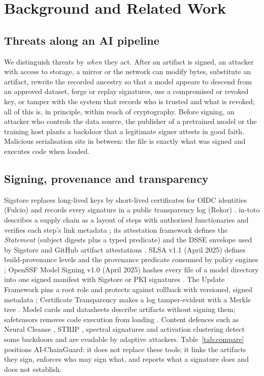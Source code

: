 \documentclass[conference]{IEEEtran}
\newcommand{\sys}{AI-ChainGuard}
\begin{document}
\section{Background and Related Work}\label{sec:related}

\subsection{Threats along an AI pipeline}
We distinguish threats by \emph{when} they act. After an artifact is signed, an attacker with access to storage, a mirror or the network can modify bytes, substitute an artifact, rewrite the recorded ancestry so that a model appears to descend from an approved dataset, forge or replay signatures, use a compromised or revoked key, or tamper with the system that records who is trusted and what is revoked; all of this is, in principle, within reach of cryptography. Before signing, an attacker who controls the data source, the publisher of a pretrained model or the training host plants a backdoor \cite{badnets} that a legitimate signer attests in good faith. Malicious serialisation \cite{jfrog2024,rl2025} sits in between: the file is exactly what was signed and executes code when loaded.

\subsection{Signing, provenance and transparency}
Sigstore replaces long-lived keys by short-lived certificates for OIDC identities (Fulcio) and records every signature in a public transparency log (Rekor) \cite{sigstore2022}. in-toto describes a supply chain as a layout of steps with authorised functionaries and verifies each step's link metadata \cite{intoto2019}; its attestation framework defines the \emph{Statement} (subject digests plus a typed predicate) and the DSSE envelope used by Sigstore and GitHub artifact attestations \cite{intotoattest,dsse}. SLSA v1.1 (April 2025) defines build-provenance levels and the provenance predicate consumed by policy engines \cite{slsa11}; OpenSSF Model Signing v1.0 (April 2025) hashes every file of a model directory into one signed manifest with Sigstore or PKI signatures \cite{oms2025}. The Update Framework pins a root role and protects against rollback with versioned, signed metadata \cite{tuf2010}; Certificate Transparency makes a log tamper-evident with a Merkle tree \cite{rfc6962}. Model cards \cite{modelcards} and datasheets \cite{datasheets} describe artifacts without signing them; safetensors removes code execution from loading \cite{safetensors}. Content defences such as Neural Cleanse \cite{neuralcleanse}, STRIP \cite{strip}, spectral signatures \cite{spectral} and activation clustering \cite{activation} detect some backdoors and are evadable by adaptive attackers. Table~\ref{tab:compare} positions \sys: it does not replace these tools; it links the artifacts they sign, enforces who may sign what, and reports what a signature does and does not establish.
\end{document}
